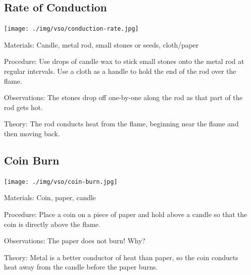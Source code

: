 \begin{multicols}{2}
\subsection{Rate of Conduction}

\begin{center}
\texttt{[image: ./img/vso/conduction-rate.jpg]}
\end{center}

\begin{description*}
\item[Materials:]{Candle, metal rod, small stones or seeds, cloth/paper}
\item[Procedure:]{Use drops of candle wax to stick small stones onto the metal rod at regular intervals. Use a cloth as a handle to hold the end of the rod over the flame.}
\item[Observations:]{The stones drop off one-by-one along the rod as that part of the rod gets hot.}
\item[Theory:]{The rod conducts heat from the flame, beginning near the flame and then moving back.}
\end{description*}

\subsection{Coin Burn}

\begin{center}
\texttt{[image: ./img/vso/coin-burn.jpg]}
\end{center}

\begin{description*}
\item[Materials:]{Coin, paper, candle}
\item[Procedure:]{Place a coin on a piece of paper and hold above a candle so that the coin is directly above the flame.}
\item[Observations:]{The paper does not burn! Why?}
\item[Theory:]{Metal is a better conductor of heat than paper, so the coin conducts heat away from the candle before the paper burns.}
\end{description*}


\end{multicols}
